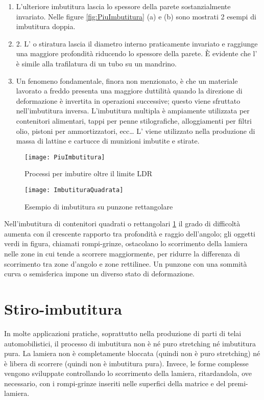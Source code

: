 \begin{enumerate}
\item L'ulteriore imbutitura lascia lo spessore della parete sostanzialmente invariato. Nelle 
figure \ref{fig:PiuImbutitura} (a) e (b) sono mostrati 2 esempi di imbutitura doppia. 
\item 2. L' o stiratura lascia il diametro interno praticamente invariato e raggiunge una maggiore profondità riducendo lo spessore della parete. È
evidente che l' è simile alla trafilatura di un tubo su un mandrino.
\item Un fenomeno fondamentale, finora non menzionato, è che un materiale lavorato a freddo presenta una maggiore duttilità quando la direzione di deformazione è invertita in operazioni successive; questo viene sfruttato nell'imbutitura inversa.
L'imbutitura multipla è ampiamente utilizzata per contenitori alimentari, tappi per penne stilografiche, alloggiamenti per filtri olio, pistoni per ammortizzatori, ecc\dots
L' viene utilizzato nella produzione di massa di lattine e cartucce di munizioni imbutite e stirate.
\end{enumerate}

\begin{figure}
\centering
\texttt{[image: PiuImbutitura]}
\caption{Processi per imbutire oltre il limite \ac{LDR}}
\label{fig:PiuImbutitura}
\texttt{[image: ImbutituraQuadrata]}
\caption{Esempio di imbutitura su punzone rettangolare}
\label{fig:ImbutituraQuadrata}
\end{figure}

Nell'imbutitura di contenitori quadrati o rettangolari \ref{fig:ImbutituraQuadrata} il grado di difficoltà aumenta con il crescente rapporto tra profondità e raggio dell'angolo; gli oggetti verdi in figura, chiamati rompi-grinze, ostacolano lo scorrimento della lamiera nelle zone in cui tende a scorrere maggiormente, per ridurre la differenza di scorrimento tra zone d'angolo e zone rettilinee.
Un punzone con una sommità curva o semisferica impone un diverso stato di deformazione.

\section{Stiro-imbutitura}
In molte applicazioni pratiche, soprattutto nella produzione di parti di telai automobilistici, il processo di imbutitura non è né puro stretching né imbutitura pura.
La lamiera non è completamente bloccata (quindi non è puro stretching) né è libera di scorrere (quindi non è imbutitura pura).
Invece, le forme complesse vengono sviluppate controllando lo scorrimento della lamiera, ritardandola, ove necessario, con i rompi-grinze inseriti nelle superfici della matrice e del premi-lamiera.

